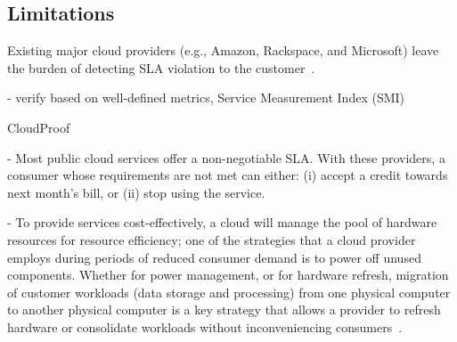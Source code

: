 \subsection{Limitations} \label{sect:sla-limitations}

Existing major cloud providers (e.g., Amazon, Rackspace, and Microsoft) leave the burden of detecting SLA violation to the customer~\cite{Bas12}.

- verify based on well-defined metrics, Service Measurement Index (SMI)

CloudProof~\cite{PLM+11}


- Most public cloud services offer a non-negotiable SLA. With these providers, a consumer whose requirements are not met can either: (i) accept a credit towards next month's bill, or (ii) stop using the service.

- To provide services cost-effectively, a cloud will manage the pool of hardware resources for resource efficiency; one of the strategies that a cloud provider employs during periods of reduced consumer demand is to power off unused components. Whether for power management, or for hardware refresh, migration of customer workloads (data storage and processing) from one physical computer to another physical computer is a key strategy that allows a provider to refresh hardware or consolidate workloads without inconveniencing consumers~\cite{BGP+12}.


